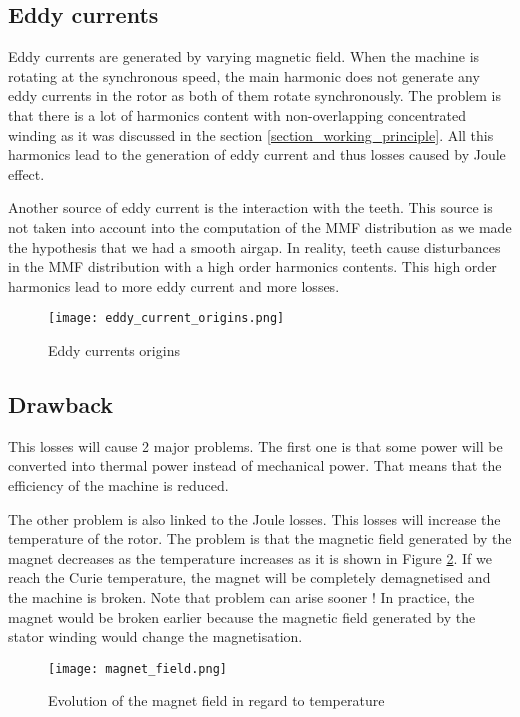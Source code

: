 \subsection{Eddy currents}
Eddy currents are generated by varying magnetic field. When the machine is rotating at the synchronous speed, the main harmonic does not generate any eddy currents in the rotor as both of them rotate synchronously. The problem is that there is a lot of harmonics content with non-overlapping concentrated winding as it was discussed in the section \ref{section_working_principle}. All this harmonics lead to the generation of eddy current and thus losses caused by Joule effect.

Another source of eddy current is the interaction with the teeth. This source is not taken into account into the computation of the MMF distribution as we made the hypothesis that we had a smooth airgap. In reality, teeth cause disturbances in the MMF distribution with a high order harmonics contents. This high order harmonics lead to more eddy current and more losses.

\begin{figure}[H]
    \centering
    \texttt{[image: eddy\_current\_origins.png]}
    \caption{Eddy currents origins}
    \label{eddy_current_origins}
\end{figure}
\subsection{Drawback}
This losses will cause 2 major problems. The first one is that some power will be converted into thermal power instead of mechanical power. That means that the efficiency of the machine is reduced.

The other problem is also linked to the Joule losses. This losses will increase the temperature of the rotor. The problem is that the magnetic field generated by the magnet decreases as the temperature increases as it is shown in Figure \ref{magnet_field}. If we reach the Curie temperature, the magnet will be completely demagnetised and the machine is broken. Note that problem can arise sooner ! In practice, the magnet would be broken earlier because the magnetic field generated by the stator winding would change the magnetisation.

\begin{figure}[H]
    \centering
    \texttt{[image: magnet\_field.png]}
    \caption{Evolution of the magnet field in regard to temperature}
    \label{magnet_field}
\end{figure}

